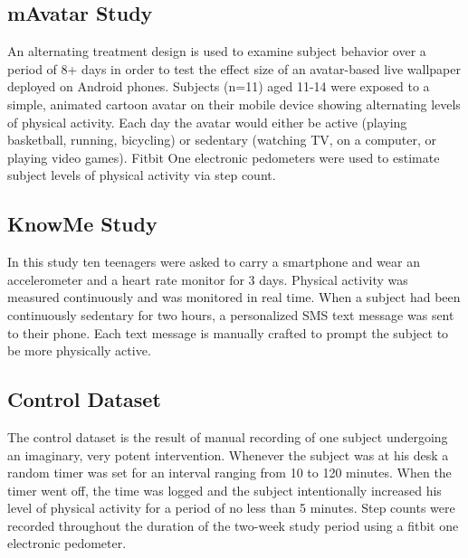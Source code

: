 
\subsection{mAvatar Study}
An alternating treatment design is used to examine subject behavior over a period of 8+ days in order to test the effect size of an avatar-based live wallpaper deployed on Android phones.
Subjects (n=11) aged 11-14 were exposed to a simple, animated cartoon avatar on their mobile device showing alternating levels of physical activity.
Each day the avatar would either be active (playing basketball, running, bicycling) or sedentary (watching TV, on a computer, or playing video games).
Fitbit One electronic pedometers were used to estimate subject levels of physical activity via step count.

\subsection{KnowMe Study}
In this study ten teenagers were asked to carry a smartphone and wear an accelerometer and a heart rate monitor for 3 days.
Physical activity was measured continuously and was monitored in real time.
When a subject had been continuously sedentary for two hours, a personalized SMS text message was sent to their phone.
Each text message is manually crafted to prompt the subject to be more physically active.


\subsection{Control Dataset}
The control dataset is the result of manual recording of one subject undergoing an imaginary, very potent intervention.
Whenever the subject was at his desk a random timer was set for an interval ranging from 10 to 120 minutes.
When the timer went off, the time was logged and the subject intentionally increased his level of physical activity for a period of no less than 5 minutes.
Step counts were recorded throughout the duration of the two-week study period using a fitbit one electronic pedometer.